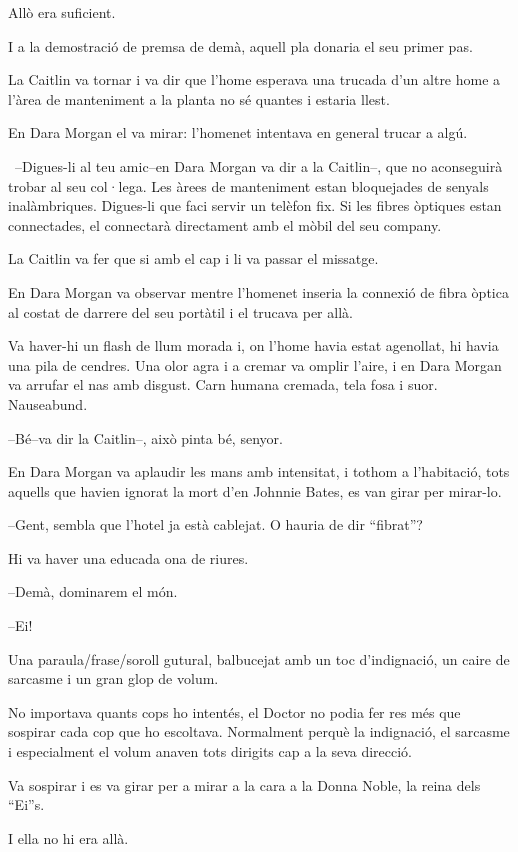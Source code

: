Allò era suficient.

I a la demostració de premsa de demà, aquell pla donaria el seu primer
pas.

La Caitlin va tornar i va dir que l'home esperava una trucada d'un altre
home a l'àrea de manteniment a la planta no sé quantes i estaria llest.

En Dara Morgan el va mirar: l'homenet intentava en general trucar a
algú.

~--Digues-li al teu amic--en Dara Morgan va dir a la Caitlin--, que no
aconseguirà trobar al seu col·lega. Les àrees de manteniment estan
bloquejades de senyals inalàmbriques. Digues-li que faci servir un
telèfon fix. Si les fibres òptiques estan connectades, el connectarà
directament amb el mòbil del seu company.

La Caitlin va fer que si amb el cap i li va passar el missatge.

En Dara Morgan va observar mentre l'homenet inseria la connexió de fibra
òptica al costat de darrere del seu portàtil i el trucava per allà.

Va haver-hi un flash de llum morada i, on l'home havia estat agenollat,
hi havia una pila de cendres. Una olor agra i a cremar va omplir l'aire,
i en Dara Morgan va arrufar el nas amb disgust. Carn humana cremada,
tela fosa i suor. Nauseabund.

--Bé--va dir la Caitlin--, això pinta bé, senyor.

En Dara Morgan va aplaudir les mans amb intensitat, i tothom a
l'habitació, tots aquells que havien ignorat la mort d'en Johnnie Bates,
es van girar per mirar-lo.

--Gent, sembla que l'hotel ja està cablejat. O hauria de dir ``fibrat''?

Hi va haver una educada ona de riures.

--Demà, dominarem el món.

--Ei!

Una paraula/frase/soroll gutural, balbucejat amb un toc d'indignació, un
caire de sarcasme i un gran glop de volum.

No importava quants cops ho intentés, el Doctor no podia fer res més que
sospirar cada cop que ho escoltava. Normalment perquè la indignació, el
sarcasme i especialment el volum anaven tots dirigits cap a la seva
direcció.

Va sospirar i es va girar per a mirar a la cara a la Donna Noble, la
reina dels ``Ei''s.

I ella no hi era allà.

